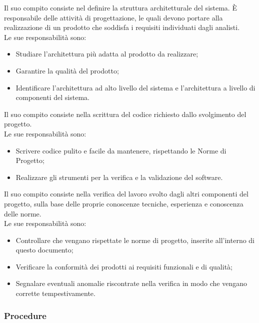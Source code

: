 
            Il suo compito consiste nel definire la struttura architetturale del sistema.
            È responsabile delle attività di progettazione, le quali devono portare alla realizzazione di un prodotto che soddisfa i requisiti individuati dagli analisti.\\
            Le sue responsabilità sono:

\begin{itemize}
\item Studiare l'architettura più adatta al prodotto da realizzare;
\item Garantire la qualità del prodotto;
\item Identificare l'architettura ad alto livello del sistema e l'architettura a livello di componenti del sistema.
\end{itemize}


            Il suo compito consiste nella scrittura del codice richiesto dallo svolgimento del progetto. \\
            Le sue responsabilità sono:

\begin{itemize}
\item Scrivere codice pulito e facile da mantenere, rispettando le Norme di Progetto;
\item Realizzare gli strumenti per la verifica e la validazione del software.
\end{itemize}

            Il suo compito consiste nella verifica del lavoro svolto dagli altri componenti del progetto, sulla base delle proprie conoscenze tecniche, esperienza e conoscenza delle norme. \\
            Le sue responsabilità sono:

\begin{itemize}
\item Controllare che vengano rispettate le norme di progetto, inserite all'interno di questo documento;
\item Verificare la conformità dei prodotti ai requisiti funzionali e di qualità;
\item Segnalare eventuali anomalie riscontrate nella verifica in modo che vengano corrette tempestivamente.
\end{itemize}

        \subsubsection{Procedure}

